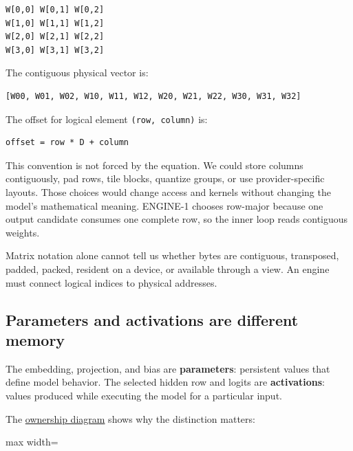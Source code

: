 \documentclass[
  10pt,
]{article}
\begin{document}
\begin{verbatim}
W[0,0] W[0,1] W[0,2]
W[1,0] W[1,1] W[1,2]
W[2,0] W[2,1] W[2,2]
W[3,0] W[3,1] W[3,2]
\end{verbatim}

The contiguous physical vector is:

\begin{verbatim}
[W00, W01, W02, W10, W11, W12, W20, W21, W22, W30, W31, W32]
\end{verbatim}

The offset for logical element \texttt{(row,\ column)} is:

\begin{verbatim}
offset = row * D + column
\end{verbatim}

This convention is not forced by the equation. We could store columns
contiguously, pad rows, tile blocks, quantize groups, or use
provider-specific layouts. Those choices would change access and kernels
without changing the model's mathematical meaning. ENGINE-1 chooses
row-major because one output candidate consumes one complete row, so the
inner loop reads contiguous weights.

Matrix notation alone cannot tell us whether bytes are contiguous,
transposed, padded, packed, resident on a device, or available through a
view. An engine must connect logical indices to physical addresses.

\subsection{Parameters and activations are different
memory}\label{parameters-and-activations-are-different-memory}

The embedding, projection, and bias are \textbf{parameters}: persistent
values that define model behavior. The selected hidden row and logits
are \textbf{activations}: values produced while executing the model for
a particular input.

The
\href{https://github.com/hermonai/inside-the-llm-engine/blob/astra-visual-rewrite/diagrams/model/parameters-vs-activations.txt}{ownership
diagram} shows why the distinction matters:

\begin{center}\begin{adjustbox}{max width=\linewidth}\end{adjustbox}\end{center}
\end{document}
